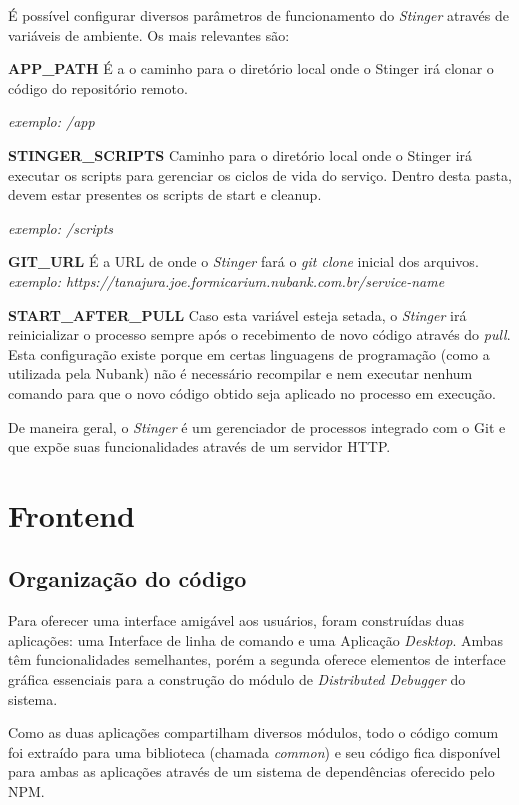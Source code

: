 \documentclass[twosideprint]{politex}
\begin{document}
	É possível configurar diversos parâmetros de funcionamento do \textit{Stinger} através de variáveis de ambiente. Os mais relevantes são:
	
	\textbf{APP\_PATH}
	\newline
	É a o caminho para o diretório local onde o Stinger irá clonar o código do repositório remoto.
	
	\textit{exemplo: /app}

	\textbf{STINGER\_SCRIPTS}
	\newline
	Caminho para o diretório local onde o Stinger irá executar os scripts para gerenciar os ciclos de vida do serviço. Dentro desta pasta, devem estar presentes os scripts de start e cleanup.
	
	\textit{exemplo: /scripts}
	
	\textbf{GIT\_URL}
	\newline
	É a URL de onde o \textit{Stinger} fará o \textit{git clone} inicial dos arquivos.
	\textit{exemplo: https://tanajura.joe.formicarium.nubank.com.br/service-name}
	
	\textbf{START\_AFTER\_PULL}
	\newline
	Caso esta variável esteja setada, o \textit{Stinger} irá reinicializar o processo sempre após o recebimento de novo código através do \textit{pull}. Esta configuração existe porque em certas linguagens de programação (como a utilizada pela Nubank) não é necessário recompilar e nem executar nenhum comando para que o novo código obtido seja aplicado no processo em execução.
    
	De maneira geral, o \textit{Stinger} é um gerenciador de processos integrado com o Git e que expõe suas funcionalidades através de um servidor HTTP.

\section{Frontend}
    \subsection{Organização do código}
Para oferecer uma interface amigável aos usuários, foram construídas duas aplicações: uma Interface de linha de comando e uma Aplicação \textit{Desktop}. Ambas têm funcionalidades semelhantes, porém a segunda oferece elementos de interface gráfica essenciais para a construção do módulo de \textit{Distributed Debugger} do sistema.

Como as duas aplicações compartilham diversos módulos, todo o código comum foi extraído para uma biblioteca (chamada \textit{common}) e seu código fica disponível para ambas as aplicações através de um sistema de dependências oferecido pelo NPM.
\end{document}
